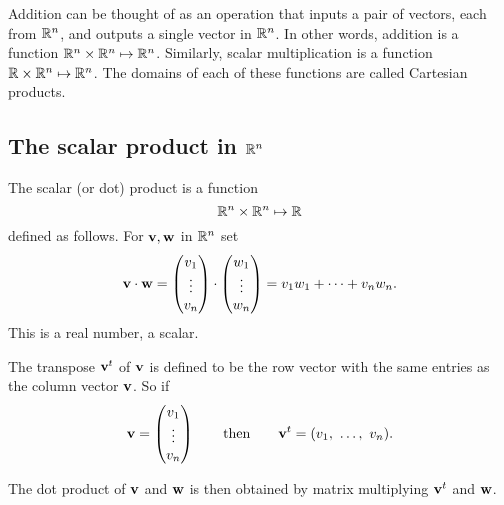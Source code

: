 \documentclass[10pt, a4paper]{article}
\begin{document}
Addition can be thought of as an operation that inputs a pair of vectors, each from $\mathbb{R} ^ n$, and outputs a single vector in $\mathbb{R} ^ n$. In other words, addition is a function $\mathbb{R} ^ n \times \mathbb{R} ^ n \mapsto \mathbb{R} ^ n$. Similarly, scalar multiplication is a function $\mathbb{R} \times \mathbb{R} ^ n \mapsto \mathbb{R} ^ n$. The domains of each of these functions are called Cartesian products.

\subsection{The scalar product in $\mathbb{R} ^ n$}

\begin{definition}
    The scalar (or dot) product is a function
    \[
    \mathbb{R} ^ n \times \mathbb{R} ^ n \mapsto \mathbb{R}
    \]
    defined as follows. For $\mathbf{v, w}$ in $\mathbb{R} ^ n$ set
    \[
    \mathbf{v \cdot w} =
    \begin{pmatrix}
        v_1 \\
        \vdots \\
        v_n
    \end{pmatrix}
    \cdot
    \begin{pmatrix}
        w_1 \\
        \vdots \\
        w_n
    \end{pmatrix}
    =
    v_1 w_1 + \cdots + v_n w_n.
    \]
    This is a real number, a scalar.
\end{definition}

The transpose $\mathbf{v} ^ t$ of $\mathbf{v}$ is defined to be the row vector with the same entries as the column vector $\mathbf{v}$. So if
\[
\mathbf{v} = \begin{pmatrix}
    v_1 \\
    \vdots \\
    v_n
\end{pmatrix}
\qquad\text{then}
\qquad\mathbf{v} ^ t = (v_1,\ \dots,\ v_n).
\]

The dot product of $\mathbf{v}$ and $\mathbf{w}$ is then obtained by matrix multiplying $\mathbf{v} ^ t$ and $\mathbf{w}$.
\end{document}
